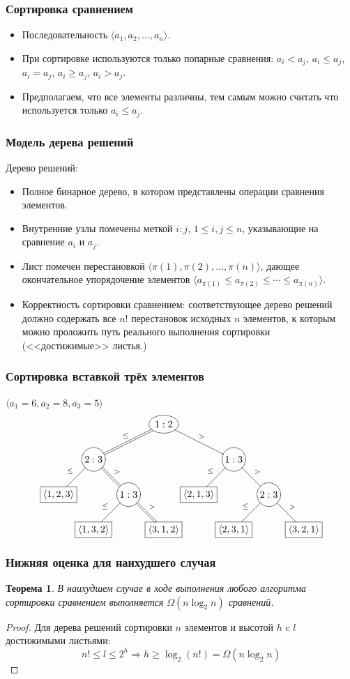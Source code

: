 \documentclass[hyperref={unicode=true}]{beamer}
\newtheorem{rtheorem}{Теорема}
\begin{document}
\frame
{
  \frametitle{Сортировка сравнением}
  \begin{itemize}
  \item Последовательность $\langle a_1, a_2, \ldots, a_n \rangle$.
  \item При сортировке используются только попарные сравнения:
    $a_i < a_j$, $a_i \leq a_j$, $a_i = a_j$, $a_i  \geq a_j$,
    $a_i > a_j$.
  \item Предполагаем, что все элементы различны, тем самым можно
    считать что используется только $a_i \leq a_j$.
  \end{itemize}
}

\frame
{
  \frametitle{Модель дерева решений}
  Дерево решений: 
  \begin{itemize}
    \item Полное бинарное дерево, в котором представлены операции
      сравнения элементов. 
    \item Внутренние узлы помечены меткой $i:j$, $1 \leq i,j \leq n$,
      указывающие на сравнение $a_i$ и $a_j$. 
    \item Лист помечен перестановкой 
      $\langle \pi(1), \pi(2), \ldots, \pi(n) \rangle$, дающее
      окончательное упорядочение элементов  
      $\langle a_{\pi(1)} \leq a_{\pi(2)} \leq \cdots \leq
      a_{\pi(n)}\rangle$.
    \item Корректность сортировки сравнением: соответствующее дерево
      решений должно содержать все $n!$ перестановок исходных $n$
      элементов, к которым можно проложить путь реального выполнения
      сортировки (<<достижимые>> листья.)
  \end{itemize}
}

\frame
{
  \frametitle{Сортировка вставкой трёх элементов}
$\langle a_1 = 6, a_2 = 8, a_3 = 5 \rangle $
\[\xygraph{
  [] *+[o]+[F]{1:2}
  (-@{=}_\leq[dll] *+=[o]+[F]{2:3}
    (-_\leq[dl] *+[F]{\langle 1,2,3 \rangle}
    ,-@{=}^{>}[dr] *+=[o]+[F]{1:3}
      (-_\leq[dl] *+[F]{\langle 1,3,2 \rangle }
      ,-@{=}^{>}[dr] *+[F]{\langle 3,1,2 \rangle }
      )
    )
  ,-^{>}[drr] *+=[o]+[F]{1:3}
    (-_\leq[dl] *+[F]{\langle 2,1,3 \rangle}
    ,-^{>}[dr] *+=[o]+[F]{2:3}
      (-_\leq[dl] *+[F]{\langle 2,3,1 \rangle }
      ,-^{>}[dr] *+[F]{\langle 3,2,1 \rangle }
      )
    )
  )
}
\]
}

\frame
{
  \frametitle{Нижняя оценка для наихудшего случая}
  \begin{rtheorem}
    В наихудшем случае в ходе выполнения любого алгоритма сортировки
    сравнением выполняется $\Omega(n\log_2 n)$ сравнений. 
  \end{rtheorem}
  \begin{proof}
    Для дерева решений сортировки $n$ элементов и высотой $h$ c $l$ достижимыми листьями:
    \[
    n! \leq l \leq 2^h\Rightarrow h \geq \log_2(n!) = \Omega(n\log_2n)
    \]
  \end{proof}
}
\end{document}
